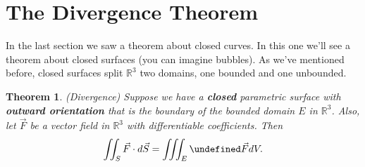 \documentclass[12pt]{article}
\title{}
\newcommand{\R}{ \mathbb{R}}
\newcommand{\vF}{\vec{F}}
\newcommand{\Fsur}{\vF\cdot d\vS}
\newcommand{\vS}{\vec{S}}
\let \div \undefined
\DeclareMathOperator{\div}{div}
\newtheorem{theorem}{Theorem}
\begin{document}
\section*{The Divergence Theorem}

In the last section we saw a theorem about closed curves. In this one we'll see a theorem about closed surfaces (you can imagine bubbles). As we've mentioned before, closed surfaces split $\R^3$ two domains, one bounded and one unbounded.


\begin{theorem}(Divergence)
Suppose we have a \textbf{closed} parametric surface with \textbf{outward orientation } that is the boundary of the bounded domain $E$ in $\R^3$. Also, let $\vF$ be a vector field in $\R^3$ with differentiable coefficients. Then
$$\iint_S\Fsur=\iiint_E \div \vF dV.$$
\end{theorem}
\end{document}
